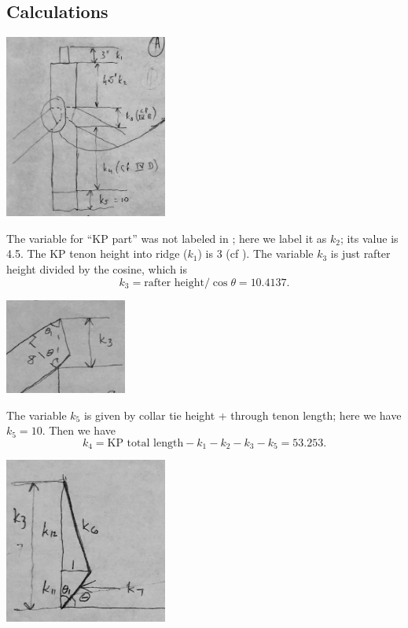 \documentclass{article}\usepackage[]{graphicx}\usepackage[]{xcolor}
\begin{document}
\subsection{Calculations} \label{kp-rafter-joints-calculations}

\begin{center}
\end{center}

\begin{center}
	\includegraphics[width=0.4\textwidth]{images/kingpost_overall}
\end{center}





The variable for ``KP part'' was not labeled in ; here we label it as $k_2$; its value is 4.5. The KP tenon height into ridge ($k_1$) is 3 (cf ). The variable $k_3$ is just rafter height divided by the cosine, which is 
\[ k_3 = \text{rafter height}/\cos\theta = 10.4137.   \]

\begin{center}
	\includegraphics[width=0.3\textwidth]{images/k3}
\end{center}

The variable $k_5$ is given by collar tie height + through tenon length; here we have $k_5 = 10$. Then we have 
\[ k_4 = \text{KP total length} - k_1 - k_2 - k_3 - k_5 = 53.253. \]


\begin{center}
	\includegraphics[width=0.4\textwidth]{images/kp_shoulder_angles}
\end{center}
\end{document}
